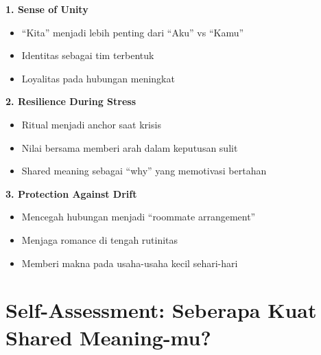 \begin{praktikbox}
\textbf{1. Sense of Unity}
\begin{itemize}
    \item ``Kita'' menjadi lebih penting dari ``Aku'' vs ``Kamu''
    \item Identitas sebagai tim terbentuk
    \item Loyalitas pada hubungan meningkat
\end{itemize}

\textbf{2. Resilience During Stress}
\begin{itemize}
    \item Ritual menjadi anchor saat krisis
    \item Nilai bersama memberi arah dalam keputusan sulit
    \item Shared meaning sebagai ``why'' yang memotivasi bertahan
\end{itemize}

\textbf{3. Protection Against Drift}
\begin{itemize}
    \item Mencegah hubungan menjadi ``roommate arrangement''
    \item Menjaga romance di tengah rutinitas
    \item Memberi makna pada usaha-usaha kecil sehari-hari
\end{itemize}
\end{praktikbox}

\section{Self-Assessment: Seberapa Kuat Shared Meaning-mu?}

